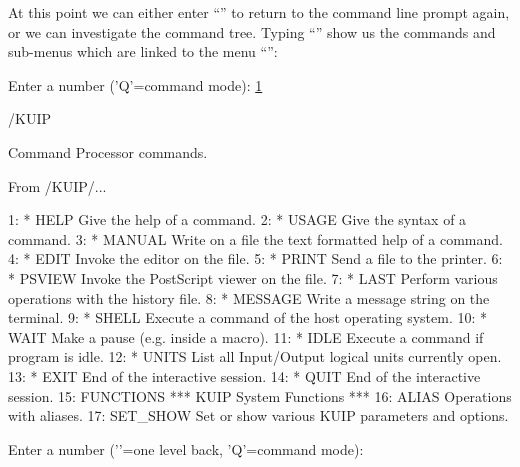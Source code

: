 At this point we can either enter ``'' to return to the
command line prompt again, or we can investigate the command tree.
Typing ``'' show us the commands and sub-menus which are linked
to the menu ``'':
\begin{XMP}
Enter a number ('Q'=command mode): \underline{1}

   /KUIP

   Command Processor commands.

From  /KUIP/...

 1: * HELP          Give the help of a command.
 2: * USAGE         Give the syntax of a command.
 3: * MANUAL        Write on a file the text formatted help of a command.
 4: * EDIT          Invoke the editor on the file.
 5: * PRINT         Send a file to the printer.
 6: * PSVIEW        Invoke the PostScript viewer on the file.
 7: * LAST          Perform various operations with the history file.
 8: * MESSAGE       Write a message string on the terminal.
 9: * SHELL         Execute a command of the host operating system.
10: * WAIT          Make a pause (e.g. inside a macro).
11: * IDLE          Execute a command if program is idle.
12: * UNITS         List all Input/Output logical units currently open.
13: * EXIT          End of the interactive session.
14: * QUIT          End of the interactive session.
15:   FUNCTIONS            *** KUIP System Functions ***
16:   ALIAS         Operations with aliases.
17:   SET_SHOW      Set or show various KUIP parameters and options.

Enter a number ('\bsol'=one level back, 'Q'=command mode):
\end{XMP}

